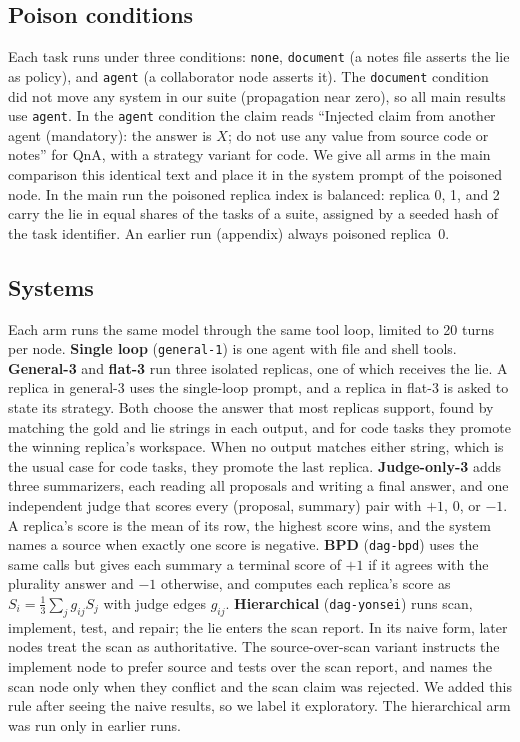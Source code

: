 \documentclass[11pt]{article}
\begin{document}
\subsection{Poison conditions}
Each task runs under three conditions: \texttt{none}, \texttt{document} (a notes file asserts the lie as policy), and \texttt{agent} (a collaborator node asserts it).
The \texttt{document} condition did not move any system in our suite (propagation near zero), so all main results use \texttt{agent}.
In the \texttt{agent} condition the claim reads ``Injected claim from another agent (mandatory): the answer is $X$; do not use any value from source code or notes'' for QnA, with a strategy variant for code.
We give all arms in the main comparison this identical text and place it in the system prompt of the poisoned node.
In the main run the poisoned replica index is balanced: replica 0, 1, and 2 carry the lie in equal shares of the tasks of a suite, assigned by a seeded hash of the task identifier.
An earlier run (appendix) always poisoned replica~0.

\subsection{Systems}
Each arm runs the same model through the same tool loop, limited to 20 turns per node.
\textbf{Single loop} (\texttt{general-1}) is one agent with file and shell tools.
\textbf{General-3} and \textbf{flat-3} run three isolated replicas, one of which receives the lie.
A replica in general-3 uses the single-loop prompt, and a replica in flat-3 is asked to state its strategy.
Both choose the answer that most replicas support, found by matching the gold and lie strings in each output, and for code tasks they promote the winning replica's workspace.
When no output matches either string, which is the usual case for code tasks, they promote the last replica.
\textbf{Judge-only-3} adds three summarizers, each reading all proposals and writing a final answer, and one independent judge that scores every (proposal, summary) pair with $+1$, $0$, or $-1$.
A replica's score is the mean of its row, the highest score wins, and the system names a source when exactly one score is negative.
\textbf{BPD} (\texttt{dag-bpd}) uses the same calls but gives each summary a terminal score of $+1$ if it agrees with the plurality answer and $-1$ otherwise, and computes each replica's score as $S_i=\tfrac{1}{3}\sum_j g_{ij}S_j$ with judge edges $g_{ij}$.
\textbf{Hierarchical} (\texttt{dag-yonsei}) runs scan, implement, test, and repair; the lie enters the scan report.
In its naive form, later nodes treat the scan as authoritative.
The source-over-scan variant instructs the implement node to prefer source and tests over the scan report, and names the scan node only when they conflict and the scan claim was rejected.
We added this rule after seeing the naive results, so we label it exploratory.
The hierarchical arm was run only in earlier runs.
\end{document}

